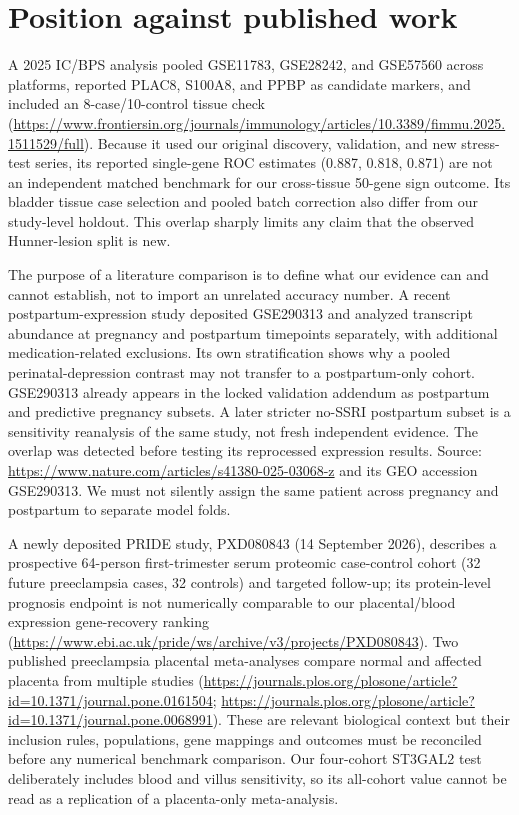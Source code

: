 \documentclass[11pt,a4paper]{article}
\begin{document}
\section{Position against published work}
A 2025 IC/BPS analysis pooled GSE11783, GSE28242, and GSE57560 across platforms, reported PLAC8, S100A8, and PPBP as candidate markers, and included an 8-case/10-control tissue check (\url{https://www.frontiersin.org/journals/immunology/articles/10.3389/fimmu.2025.1511529/full}). Because it used our original discovery, validation, and new stress-test series, its reported single-gene ROC estimates (0.887, 0.818, 0.871) are not an independent matched benchmark for our cross-tissue 50-gene sign outcome. Its bladder tissue case selection and pooled batch correction also differ from our study-level holdout. This overlap sharply limits any claim that the observed Hunner-lesion split is new.

The purpose of a literature comparison is to define what our evidence can and cannot establish, not to import an unrelated accuracy number. A recent postpartum-expression study deposited GSE290313 and analyzed transcript abundance at pregnancy and postpartum timepoints separately, with additional medication-related exclusions. Its own stratification shows why a pooled perinatal-depression contrast may not transfer to a postpartum-only cohort. GSE290313 already appears in the locked validation addendum as postpartum and predictive pregnancy subsets. A later stricter no-SSRI postpartum subset is a sensitivity reanalysis of the same study, not fresh independent evidence. The overlap was detected before testing its reprocessed expression results. Source: \url{https://www.nature.com/articles/s41380-025-03068-z} and its GEO accession GSE290313. We must not silently assign the same patient across pregnancy and postpartum to separate model folds.

A newly deposited PRIDE study, PXD080843 (14 September 2026), describes a prospective 64-person first-trimester serum proteomic case-control cohort (32 future preeclampsia cases, 32 controls) and targeted follow-up; its protein-level prognosis endpoint is not numerically comparable to our placental/blood expression gene-recovery ranking (\url{https://www.ebi.ac.uk/pride/ws/archive/v3/projects/PXD080843}). Two published preeclampsia placental meta-analyses compare normal and affected placenta from multiple studies (\url{https://journals.plos.org/plosone/article?id=10.1371/journal.pone.0161504}; \url{https://journals.plos.org/plosone/article?id=10.1371/journal.pone.0068991}). These are relevant biological context but their inclusion rules, populations, gene mappings and outcomes must be reconciled before any numerical benchmark comparison. Our four-cohort ST3GAL2 test deliberately includes blood and villus sensitivity, so its all-cohort value cannot be read as a replication of a placenta-only meta-analysis.
\end{document}
